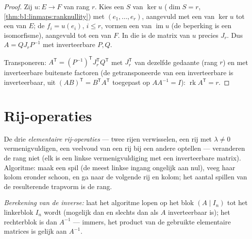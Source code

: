 \begin{proof}
Zij $u \colon E \to F$ van rang $r$. Kies een  $S$ van
$\ker u$ ($\dim S = r$, \cref{thm:b1:linmaps:ranknullity}) met 
$(e_1, \dots, e_r)$, aangevuld met een  van $\ker u$ tot een
 van $E$; de  $f_i = u(e_i)$, $i \leq r$, vormen een
 van $\operatorname{im} u$ (de beperking is een isomorfisme),
aangevuld tot een  van $F$. In die  is de matrix van $u$
precies $J_r$. Dus $A = Q J_r P^{-1}$ met inverteerbare $P, Q$.

Transponeren: $A^{\mathsf T} = (P^{-1})^{\mathsf T} J_r^{\mathsf T}
Q^{\mathsf T}$ met $J_r^{\mathsf T}$ van dezelfde gedaante (rang
$r$) en met inverteerbare buitenste factoren (de getransponeerde van
een inverteerbare is inverteerbaar, uit $(AB)^{\mathsf T} =
B^{\mathsf T}A^{\mathsf T}$ toegepast op $AA^{-1} = I$):
$\operatorname{rk} A^{\mathsf T} = r$.
\end{proof}

\section{Rij-operaties}

\begin{method}\label{met:b1:matrices:gauss}
De drie \emph{elementaire rij-operaties} ---
twee rijen verwisselen, een rij met $\lambda \neq 0$
vermenigvuldigen, een veelvoud van een rij bij een andere optellen
--- veranderen de rang niet (elk is een linkse vermenigvuldiging met
een inverteerbare matrix). Algoritme: maak een spil (de meest linkse
ingang ongelijk aan nul), veeg haar kolom eronder schoon, en ga naar
de volgende rij en kolom; het aantal spillen van de resulterende
trapvorm is de rang.

\emph{Berekening van de inverse:} laat het algoritme lopen op het
blok $(A \mid I_n)$ tot het linkerblok $I_n$ wordt (mogelijk dan en
slechts dan als $A$ inverteerbaar is); het rechterblok is dan
$A^{-1}$ --- immers, het product van de gebruikte elementaire
matrices is gelijk aan $A^{-1}$.
\end{method}


